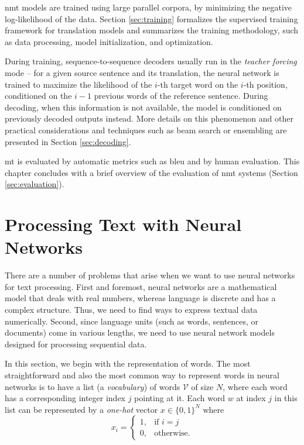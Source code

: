 \ac{nmt} models are trained using large parallel corpora, by minimizing the
negative log-likelihood of the data.  Section \ref{sec:training} formalizes the
supervised training framework for translation models and summarizes the
training methodology, such as data processing, model initialization, and
optimization.

During training, sequence-to-sequence decoders usually run in the \emph{teacher
  forcing} mode -- for a given source sentence and its translation, the neural
network is trained to maximize the likelihood of the $i$-th target word on the
$i$-th position, conditioned on the $i-1$ previous words of the reference
sentence. During decoding, when this information is not available, the model is
conditioned on previously decoded outputs instead. More details on this
phenomenon and other practical considerations and techniques such as beam
search or ensembling are presented in Section \ref{sec:decoding}.


\Ac{mt} is evaluated by automatic metrics such as \acs{bleu} and by human
evaluation. This chapter concludes with a brief overview of the evaluation of
\ac{nmt} systems (Section \ref{sec:evaluation}).

\section{Processing Text with Neural Networks}
\label{sec:text-processing}

There are a number of problems that arise when we want to use neural networks
for text processing. First and foremost, neural networks are a mathematical
model that deals with real numbers, whereas language is discrete and has a
complex structure. Thus, we need to find ways to express textual data
numerically. Second, since language units (such as words, sentences, or
documents) come in various lengths, we need to use neural network models
designed for processing sequential data.

In this section, we begin with the representation of words. The most
straightforward and also the most common way to represent words in neural
networks is to have a list (a \emph{vocabulary}) of words $\mathcal{V}$ of size
$N$, where each word has a corresponding integer index $j$ pointing at it. Each
word $w$ at index $j$ in this list can be represented by a \emph{one-hot} vector
$x \in \{0,1\}^N$ where
%
\begin{equation} x_i =
\begin{cases} 1, & \text{if } i = j \\ 0, & \text{otherwise.}
\end{cases}
\end{equation}
%

